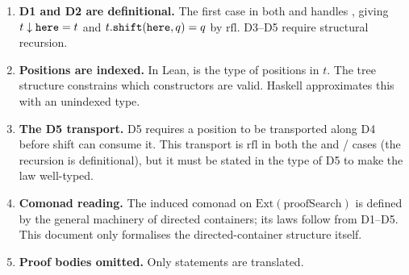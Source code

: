 \documentclass[11pt,a4paper]{article}
\begin{document}
\begin{enumerate}
\item \textbf{D1 and D2 are definitional.}  The first case in both
   and  handles , giving
  $t \downarrow \texttt{here} = t$ and $t.\texttt{shift}(\texttt{here}, q) = q$
  by $\mathrm{rfl}$.  D3--D5 require structural recursion.

\item \textbf{Positions are indexed.}  In Lean,  is the type of
  positions in $t$.  The tree structure constrains which constructors are
  valid.  Haskell approximates this with an unindexed  type.

\item \textbf{The D5 transport.}  D5 requires a position to be transported
  along D4 before shift can consume it.  This transport is $\mathrm{rfl}$
  in both the  and / cases (the recursion
  is definitional), but it must be stated in the type of D5 to make the law
  well-typed.

\item \textbf{Comonad reading.}  The induced comonad on
  $\mathrm{Ext}(\mathrm{proofSearch})$ is defined by the general machinery of
  directed containers; its laws follow from D1--D5.  This document only
  formalises the directed-container structure itself.

\item \textbf{Proof bodies omitted.}  Only statements are translated.
\end{enumerate}
\end{document}
